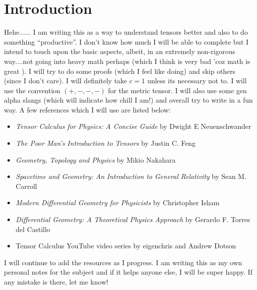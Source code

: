 \section{Introduction}
Hehe...... I am writing this as a way to understand tensors better and also to do something ``productive''. I don't know how much I will be able to complete but I intend to touch upon the basic aspects, albeit, in an extremely non-rigorous way....not going into heavy math perhaps (which I think is very bad 'coz math is great ). I will try to do some proofs (which I feel like doing) and skip others (since I don't care). I will definitely take $c=1$ unless its necessary not to. I will use the convention $(+,-,-,-)$ for the metric tensor. I will also use some gen alpha slangs (which will indicate how chill I am!) and overall try to write in a fun way. A few references which I will use are listed below:
\begin{itemize}
    \item \textit{Tensor Calculus for Physics: A Concise Guide
} by Dwight E Neuenschwander
\item \textit{The Poor Man’s Introduction to Tensors} by Justin C. Feng
\item \textit{Geometry, Topology and Physics} by Mikio Nakahara
\item \textit{Spacetime and Geometry: An Introduction to General Relativity} by Sean M. Carroll
\item \textit{Modern Differential Geometry for Physicists} by Christopher Isham
\item \textit{Differential Geometry: A Theoretical Physics Approach} by Gerardo F. Torres del Castillo
\item Tensor Calculus YouTube video series by eigenchris and Andrew Dotson
\end{itemize}
I will continue to add the resources as I progress. I am writing this as my own personal notes for the subject and if it helps anyone else, I will be super happy. If any mistake is there, let me know! 